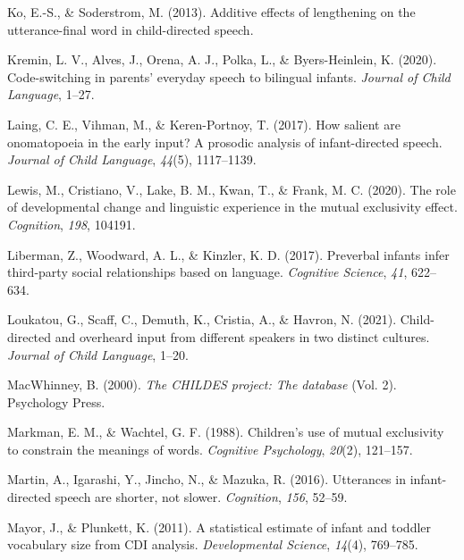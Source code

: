 \documentclass[10pt, letterpaper]{article}
\newenvironment{CSLReferences}%
  {}%
  {\par}
\begin{document}
\begin{CSLReferences}{1}{0}
\leavevmode\hypertarget{ref-ko2013additive}{}%
Ko, E.-S., \& Soderstrom, M. (2013). Additive effects of lengthening on
the utterance-final word in child-directed speech.

\leavevmode\hypertarget{ref-kremin2020code}{}%
Kremin, L. V., Alves, J., Orena, A. J., Polka, L., \& Byers-Heinlein, K.
(2020). Code-switching in parents' everyday speech to bilingual infants.
\emph{Journal of Child Language}, 1--27.

\leavevmode\hypertarget{ref-laing2017salient}{}%
Laing, C. E., Vihman, M., \& Keren-Portnoy, T. (2017). How salient are
onomatopoeia in the early input? A prosodic analysis of infant-directed
speech. \emph{Journal of Child Language}, \emph{44}(5), 1117--1139.

\leavevmode\hypertarget{ref-lewis2020role}{}%
Lewis, M., Cristiano, V., Lake, B. M., Kwan, T., \& Frank, M. C. (2020).
The role of developmental change and linguistic experience in the mutual
exclusivity effect. \emph{Cognition}, \emph{198}, 104191.

\leavevmode\hypertarget{ref-liberman2017preverbal}{}%
Liberman, Z., Woodward, A. L., \& Kinzler, K. D. (2017). Preverbal
infants infer third-party social relationships based on language.
\emph{Cognitive Science}, \emph{41}, 622--634.

\leavevmode\hypertarget{ref-loukatou2021child}{}%
Loukatou, G., Scaff, C., Demuth, K., Cristia, A., \& Havron, N. (2021).
Child-directed and overheard input from different speakers in two
distinct cultures. \emph{Journal of Child Language}, 1--20.

\leavevmode\hypertarget{ref-macwhinney2000childes}{}%
MacWhinney, B. (2000). \emph{The CHILDES project: The database} (Vol.
2). Psychology Press.

\leavevmode\hypertarget{ref-markman1988children}{}%
Markman, E. M., \& Wachtel, G. F. (1988). Children's use of mutual
exclusivity to constrain the meanings of words. \emph{Cognitive
Psychology}, \emph{20}(2), 121--157.

\leavevmode\hypertarget{ref-martin2016utterances}{}%
Martin, A., Igarashi, Y., Jincho, N., \& Mazuka, R. (2016). Utterances
in infant-directed speech are shorter, not slower. \emph{Cognition},
\emph{156}, 52--59.

\leavevmode\hypertarget{ref-mayor2011statistical}{}%
Mayor, J., \& Plunkett, K. (2011). A statistical estimate of infant and
toddler vocabulary size from CDI analysis. \emph{Developmental Science},
\emph{14}(4), 769--785.


\end{CSLReferences}
\end{document}
